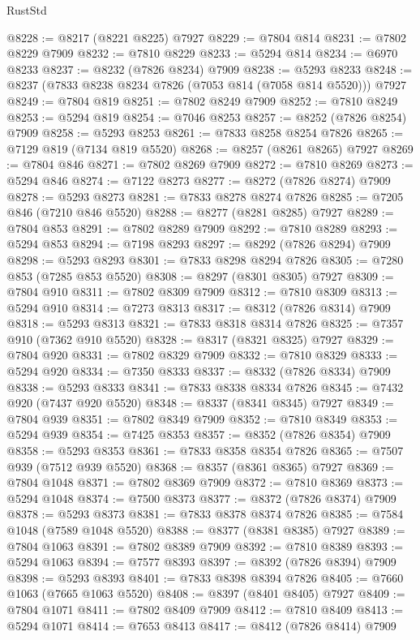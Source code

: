 \begin{lexlean}{RustStd}
\begin{coremodule}
@8228 := @8217 (@8221 @8225) @7927
@8229 := @7804 @814
@8231 := @7802 @8229 @7909
@8232 := @7810 @8229
@8233 := @5294 @814
@8234 := @6970 @8233
@8237 := @8232 (@7826 @8234) @7909
@8238 := @5293 @8233
@8248 := @8237 (@7833 @8238 @8234 @7826 (@7053 @814 (@7058 @814 @5520))) @7927
@8249 := @7804 @819
@8251 := @7802 @8249 @7909
@8252 := @7810 @8249
@8253 := @5294 @819
@8254 := @7046 @8253
@8257 := @8252 (@7826 @8254) @7909
@8258 := @5293 @8253
@8261 := @7833 @8258 @8254 @7826
@8265 := @7129 @819 (@7134 @819 @5520)
@8268 := @8257 (@8261 @8265) @7927
@8269 := @7804 @846
@8271 := @7802 @8269 @7909
@8272 := @7810 @8269
@8273 := @5294 @846
@8274 := @7122 @8273
@8277 := @8272 (@7826 @8274) @7909
@8278 := @5293 @8273
@8281 := @7833 @8278 @8274 @7826
@8285 := @7205 @846 (@7210 @846 @5520)
@8288 := @8277 (@8281 @8285) @7927
@8289 := @7804 @853
@8291 := @7802 @8289 @7909
@8292 := @7810 @8289
@8293 := @5294 @853
@8294 := @7198 @8293
@8297 := @8292 (@7826 @8294) @7909
@8298 := @5293 @8293
@8301 := @7833 @8298 @8294 @7826
@8305 := @7280 @853 (@7285 @853 @5520)
@8308 := @8297 (@8301 @8305) @7927
@8309 := @7804 @910
@8311 := @7802 @8309 @7909
@8312 := @7810 @8309
@8313 := @5294 @910
@8314 := @7273 @8313
@8317 := @8312 (@7826 @8314) @7909
@8318 := @5293 @8313
@8321 := @7833 @8318 @8314 @7826
@8325 := @7357 @910 (@7362 @910 @5520)
@8328 := @8317 (@8321 @8325) @7927
@8329 := @7804 @920
@8331 := @7802 @8329 @7909
@8332 := @7810 @8329
@8333 := @5294 @920
@8334 := @7350 @8333
@8337 := @8332 (@7826 @8334) @7909
@8338 := @5293 @8333
@8341 := @7833 @8338 @8334 @7826
@8345 := @7432 @920 (@7437 @920 @5520)
@8348 := @8337 (@8341 @8345) @7927
@8349 := @7804 @939
@8351 := @7802 @8349 @7909
@8352 := @7810 @8349
@8353 := @5294 @939
@8354 := @7425 @8353
@8357 := @8352 (@7826 @8354) @7909
@8358 := @5293 @8353
@8361 := @7833 @8358 @8354 @7826
@8365 := @7507 @939 (@7512 @939 @5520)
@8368 := @8357 (@8361 @8365) @7927
@8369 := @7804 @1048
@8371 := @7802 @8369 @7909
@8372 := @7810 @8369
@8373 := @5294 @1048
@8374 := @7500 @8373
@8377 := @8372 (@7826 @8374) @7909
@8378 := @5293 @8373
@8381 := @7833 @8378 @8374 @7826
@8385 := @7584 @1048 (@7589 @1048 @5520)
@8388 := @8377 (@8381 @8385) @7927
@8389 := @7804 @1063
@8391 := @7802 @8389 @7909
@8392 := @7810 @8389
@8393 := @5294 @1063
@8394 := @7577 @8393
@8397 := @8392 (@7826 @8394) @7909
@8398 := @5293 @8393
@8401 := @7833 @8398 @8394 @7826
@8405 := @7660 @1063 (@7665 @1063 @5520)
@8408 := @8397 (@8401 @8405) @7927
@8409 := @7804 @1071
@8411 := @7802 @8409 @7909
@8412 := @7810 @8409
@8413 := @5294 @1071
@8414 := @7653 @8413
@8417 := @8412 (@7826 @8414) @7909

\end{coremodule}
\end{lexlean}
